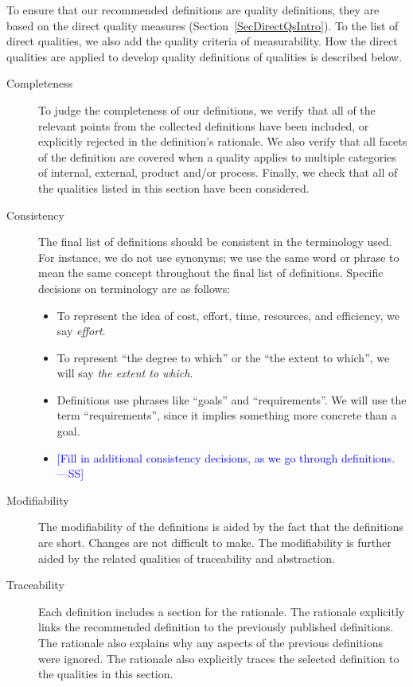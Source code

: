 \documentclass[letterpaper, cleveref]{lipics-v2019}
\newcommand{\authornote}[3]{\textcolor{#1}{[#3 ---#2]}}
\newcommand{\authornote}[3]{}
\newcommand{\wss}[1]{\authornote{blue}{SS}{#1}} %
\theoremstyle{definition}
\begin{document}
To ensure that our recommended definitions are quality definitions, they are
based on the direct quality measures (Section~\ref{SecDirectQsIntro}).  To the
list of direct qualities, we also add the quality criteria of measurability.
How the direct qualities are applied to develop quality definitions of qualities
is described below.

\begin{description}

  \item[Completeness] To judge the completeness of our definitions, we verify
  that all of the relevant points from the collected definitions have been
  included, or explicitly rejected in the definition's rationale.  We also
  verify that all facets of the definition are covered when a quality applies to
  multiple categories of internal, external, product and/or process.  Finally,
  we check that all of the qualities listed in this section have been
  considered.
  
  \item[Consistency] The final list of definitions should be consistent in the
  terminology used.  For instance, we do not use synonyms; we use
  the same word or phrase to mean the same concept throughout the final list of
  definitions.  Specific decisions on terminology are as follows:
  \begin{itemize}
    \item To represent the idea of cost, effort, time, resources, and
    efficiency, we say \emph{effort}.
    \item To represent ``the degree to which'' or the ``the extent to which'',
    we will say \emph{the extent to which}.
    \item Definitions use phrases like ``goals'' and ``requirements''.  We will
    use the term ``requirements'', since it implies something more concrete than
    a goal.
    \item \wss{Fill in additional consistency decisions, as we go through
    definitions.}
  \end{itemize}

  \item[Modifiability] The modifiability of the definitions is aided by the fact
  that the definitions are short.  Changes are not difficult to make.  The
  modifiability is further aided by the related qualities of traceability and
  abstraction.

  \item[Traceability] Each definition includes a section for the rationale.  The
  rationale explicitly links the recommended definition to the previously
  published definitions.  The rationale also explains why any aspects of the
  previous definitions were ignored.  The rationale also explicitly traces the
  selected definition to the qualities in this section.


\end{description}
\end{document}
